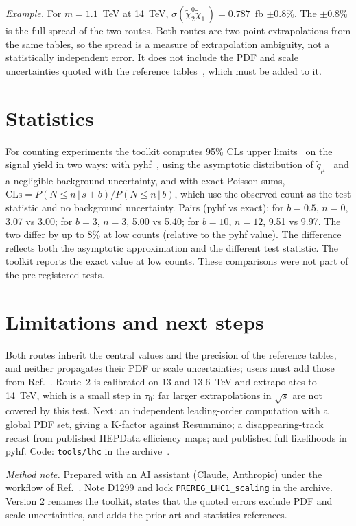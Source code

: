 \documentclass[aps,prd,twocolumn,superscriptaddress,nofootinbib,showkeys]{revtex4-2}
\begin{document}
\emph{Example.} For $m=1.1$~TeV at 14~TeV, $\sigma(\tilde\chi_2^0\tilde\chi_1^+)=0.787$~fb $\pm0.8\%$. The $\pm0.8\%$ is the full spread of the two routes. Both routes are two-point extrapolations from the same tables, so the spread is a measure of extrapolation ambiguity, not a statistically independent error. It does not include the PDF and scale uncertainties quoted with the reference tables~\cite{Res}, which must be added to it.

\section{Statistics}
For counting experiments the toolkit computes 95\% CLs upper limits~\cite{Junk,Read} on the signal yield in two ways: with pyhf~\cite{pyhf}, using the asymptotic distribution of $\tilde q_\mu$~\cite{CCGV} and a negligible background uncertainty, and with exact Poisson sums, $\mathrm{CLs}=P(N\le n\,|\,s+b)/P(N\le n\,|\,b)$, which use the observed count as the test statistic and no background uncertainty. Pairs (pyhf vs exact): for $b=0.5$, $n=0$, 3.07 vs 3.00; for $b=3$, $n=3$, 5.00 vs 5.40; for $b=10$, $n=12$, 9.51 vs 9.97. The two differ by up to 8\% at low counts (relative to the pyhf value). The difference reflects both the asymptotic approximation and the different test statistic. The toolkit reports the exact value at low counts. These comparisons were not part of the pre-registered tests.

\section{Limitations and next steps}
Both routes inherit the central values and the precision of the reference tables, and neither propagates their PDF or scale uncertainties; users must add those from Ref.~\cite{Res}. Route~2 is calibrated on 13 and 13.6~TeV and extrapolates to 14~TeV, which is a small step in $\tau_0$; far larger extrapolations in $\sqrt s$ are not covered by this test. Next: an independent leading-order computation with a global PDF set, giving a K-factor against Resummino; a disappearing-track recast from published HEPData efficiency maps; and published full likelihoods in pyhf. Code: \texttt{tools/lhc} in the archive~\cite{AEGIS}.

\emph{Method note.} Prepared with an AI assistant (Claude, Anthropic) under the workflow of Ref.~\cite{P4}. Note D1299 and lock \texttt{PREREG\_LHC1\_scaling} in the archive. Version 2 renames the toolkit, states that the quoted errors exclude PDF and scale uncertainties, and adds the prior-art and statistics references.
\end{document}
